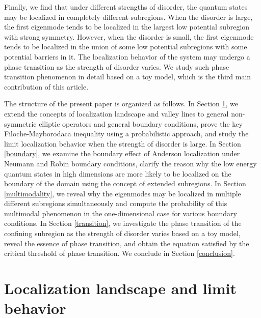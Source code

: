 \documentclass[a4paper,11pt]{article}
\begin{document}
Finally, we find that under different strengths of disorder, the quantum states may be localized in completely different subregions. When the disorder is large, the first eigenmode tends to be localized in the largest low potential subregion with strong symmetry. However, when the disorder is small, the first eigenmode tends to be localized in the union of some low potential subregions with some potential barriers in it. The localization behavior of the system may undergo a phase transition as the strength of disorder varies. We study such phase transition phenomenon in detail based on a toy model, which is the third main contribution of this article.

The structure of the present paper is organized as follows. In Section \ref{model}, we extend the concepts of localization landscape and valley lines to general non-symmetric elliptic operators and general boundary conditions, prove the key Filoche-Mayborodaca inequality using a probabilistic approach, and study the limit localization behavior when the strength of disorder is large. In Section \ref{boundary}, we examine the boundary effect of Anderson localization under Neumann and Robin boundary conditions, clarify the reason why the low energy quantum states in high dimensions are more likely to be localized on the boundary of the domain using the concept of extended subregions. In Section \ref{multimodality}, we reveal why the eigenmodes may be localized in multiple different subregions simultaneously and compute the probability of this multimodal phenomenon in the one-dimensional case for various boundary conditions. In Section \ref{transition}, we investigate the phase transition of the confining subregion as the strength of disorder varies based on a toy model, reveal the essence of phase transition, and obtain the equation satisfied by the critical threshold of phase transition. We conclude in Section \ref{conclusion}.


\section{Localization landscape and limit behavior}\label{model}
\end{document}
